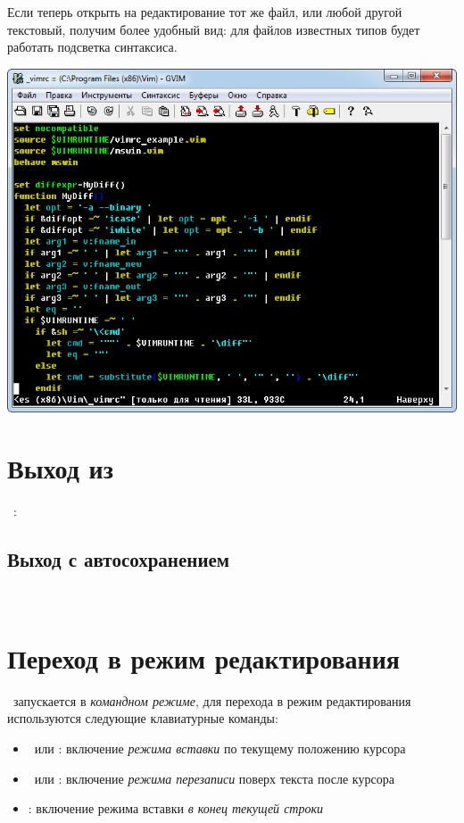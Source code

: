 \bigskip
Если теперь открыть на редактирование тот же файл, или любой другой текстовый,
получим более удобный вид: для файлов известных типов будет работать подсветка
синтаксиса.

\nopagebreak\bigskip
\includegraphics[height=0.9\textheight]{ide/vim28.png}

\section{Выход из \vim}

\ :\ \keys{!}\ \ 

\subsection{Выход с автосохранением}

\ \ 

\section{Переход в режим редактирования}

\vim\ запускается в \emph{командном режиме}, для перехода в режим редактирования
используются следующие клавиатурные команды:

\begin{itemize}
  \item {}\ или : включение \emph{режима вставки} по текущему
  положению курсора
  \item {}\ или : включение \emph{режима перезаписи}
  поверх текста после курсора
  \item {}: включение режима вставки \emph{в конец текущей строки}
\end{itemize}

